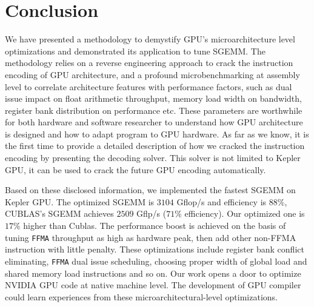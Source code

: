 \section{Conclusion}
\label{sec:conclusion}
We have presented a methodology to demystify GPU's microarchitecture level optimizations and demonstrated its application to tune SGEMM. The methodology relies on a reverse engineering approach to crack the instruction encoding of GPU architecture, and a profound microbenchmarking at assembly level to correlate architecture features with performance factors, such as dual issue impact on float arithmetic throughput, memory load width on bandwidth, register bank distribution on performance etc. These parameters are worthwhile for both hardware and software researcher to understand how GPU architecture is designed and how to adapt program to GPU hardware. As far as we know, it is the first time to provide a detailed description of how we cracked the instruction encoding by presenting the decoding solver. This solver is not limited to Kepler GPU, it can be used to crack the future GPU encoding automatically.

Based on these disclosed information, we implemented the fastest SGEMM on Kepler GPU. The optimized SGEMM is $3104$ Gflop/s and efficiency is $88\%$, CUBLAS's SGEMM achieves $2509$ Gflp/s ($71\%$ efficiency). Our optimized one is $17\%$ higher than Cublas. The performance boost is achieved on the basis of tuning {\tt FFMA} throughput as high as hardware peak, then add other non-FFMA instruction with little penalty. These optimizations include register bank conflict eliminating, {\tt FFMA} dual issue scheduling, choosing proper width of global load and shared memory load instructions and so on. Our work opens a door to optimize NVIDIA GPU code at native machine level. The development of GPU compiler could learn experiences from these microarchitectural-level optimizations.


